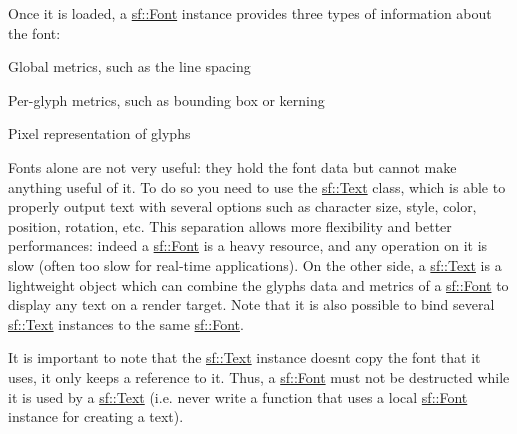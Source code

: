 Once it is loaded, a \mbox{\hyperlink{classsf_1_1_font}{sf\+::\+Font}} instance provides three types of information about the font\+: \begin{DoxyItemize}
\item Global metrics, such as the line spacing \item Per-\/glyph metrics, such as bounding box or kerning \item Pixel representation of glyphs\end{DoxyItemize}
Fonts alone are not very useful\+: they hold the font data but cannot make anything useful of it. To do so you need to use the \mbox{\hyperlink{classsf_1_1_text}{sf\+::\+Text}} class, which is able to properly output text with several options such as character size, style, color, position, rotation, etc. This separation allows more flexibility and better performances\+: indeed a \mbox{\hyperlink{classsf_1_1_font}{sf\+::\+Font}} is a heavy resource, and any operation on it is slow (often too slow for real-\/time applications). On the other side, a \mbox{\hyperlink{classsf_1_1_text}{sf\+::\+Text}} is a lightweight object which can combine the glyphs data and metrics of a \mbox{\hyperlink{classsf_1_1_font}{sf\+::\+Font}} to display any text on a render target. Note that it is also possible to bind several \mbox{\hyperlink{classsf_1_1_text}{sf\+::\+Text}} instances to the same \mbox{\hyperlink{classsf_1_1_font}{sf\+::\+Font}}.

It is important to note that the \mbox{\hyperlink{classsf_1_1_text}{sf\+::\+Text}} instance doesn\textquotesingle{}t copy the font that it uses, it only keeps a reference to it. Thus, a \mbox{\hyperlink{classsf_1_1_font}{sf\+::\+Font}} must not be destructed while it is used by a \mbox{\hyperlink{classsf_1_1_text}{sf\+::\+Text}} (i.\+e. never write a function that uses a local \mbox{\hyperlink{classsf_1_1_font}{sf\+::\+Font}} instance for creating a text).

